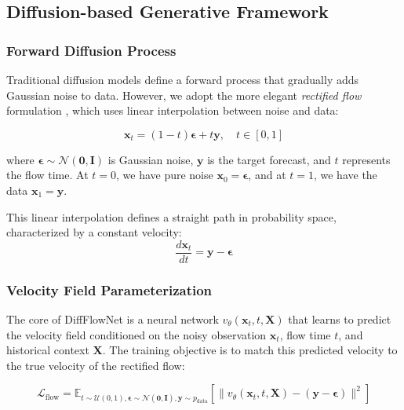 \documentclass[11pt,a4paper]{article}
\begin{document}
\subsection{Diffusion-based Generative Framework}

\subsubsection{Forward Diffusion Process}

Traditional diffusion models define a forward process that gradually adds Gaussian noise to data. However, we adopt the more elegant \textit{rectified flow} formulation \cite{liu2023rectified}, which uses linear interpolation between noise and data:

\begin{equation}
    \mathbf{x}_t = (1-t)\boldsymbol{\epsilon} + t\mathbf{y}, \quad t \in [0,1]
\end{equation}

where $\boldsymbol{\epsilon} \sim \mathcal{N}(\mathbf{0}, \mathbf{I})$ is Gaussian noise, $\mathbf{y}$ is the target forecast, and $t$ represents the flow time. At $t=0$, we have pure noise $\mathbf{x}_0 = \boldsymbol{\epsilon}$, and at $t=1$, we have the data $\mathbf{x}_1 = \mathbf{y}$.

This linear interpolation defines a straight path in probability space, characterized by a constant velocity:
\begin{equation}
    \frac{d\mathbf{x}_t}{dt} = \mathbf{y} - \boldsymbol{\epsilon}
\end{equation}

\subsubsection{Velocity Field Parameterization}

The core of DiffFlowNet is a neural network $v_\theta(\mathbf{x}_t, t, \mathbf{X})$ that learns to predict the velocity field conditioned on the noisy observation $\mathbf{x}_t$, flow time $t$, and historical context $\mathbf{X}$. The training objective is to match this predicted velocity to the true velocity of the rectified flow:

\begin{equation}
    \mathcal{L}_{\text{flow}} = \mathbb{E}_{t \sim \mathcal{U}(0,1), \boldsymbol{\epsilon} \sim \mathcal{N}(\mathbf{0}, \mathbf{I}), \mathbf{y} \sim p_{\text{data}}} \left[ \| v_\theta(\mathbf{x}_t, t, \mathbf{X}) - (\mathbf{y} - \boldsymbol{\epsilon}) \|^2 \right]
\end{equation}
\end{document}
